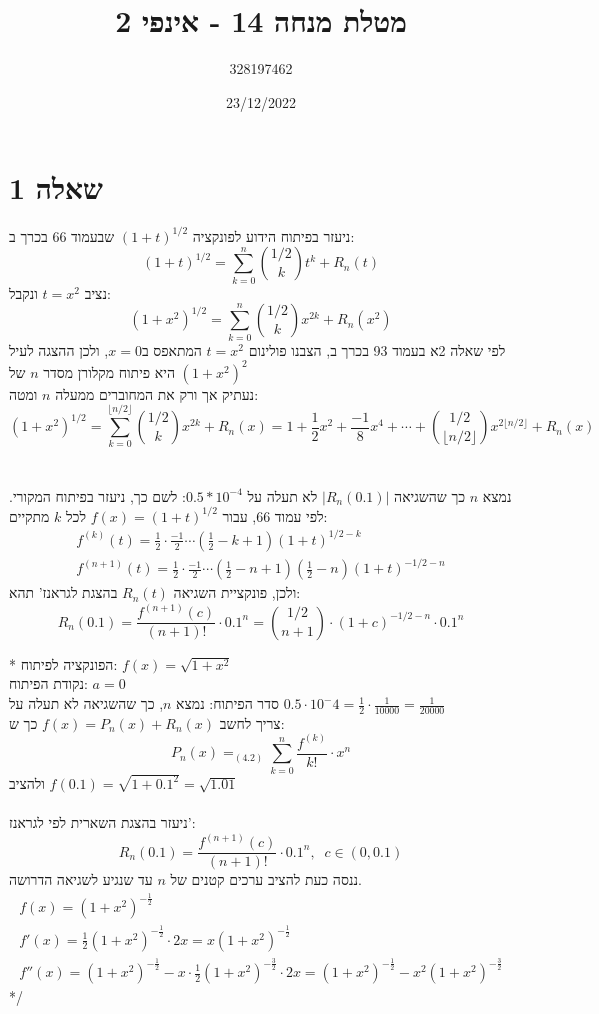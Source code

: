 \documentclass{article}
\title{מטלת מנחה 14 - אינפי 2}
\author{328197462}
\date{23/12/2022}
\DeclareMathOperator*{\equals}{=}
\begin{document}
\long{}
\maketitle

\section*{שאלה 1}

ניעזר בפיתוח הידוע לפונקציה $(1+t)^{1/2}$
שבעמוד 66 בכרך ב:
\[
    (1+t)^{1/2} = \sum_{k=0}^n \binom{1/2}{k}t^k+R_n(t)
\]
נציב $t=x^2$ ונקבל:
\[
    (1+x^2)^{1/2} = \sum_{k=0}^n \binom{1/2}{k}x^{2k}+R_n(x^2)
\]
לפי שאלה 2א בעמוד 93 בכרך ב, הצבנו פולינום $t=x^2$ המתאפס ב$x=0$,
ולכן ההצגה לעיל היא פיתוח מקלורן מסדר $n$ של $(1+x^2)^2$\\
נעתיק אך ורק את המחוברים ממעלה $n$ ומטה:
\[
    (1+x^2)^{1/2} =
    \sum_{k=0}^{\lfloor n/2 \rfloor} \binom{1/2}{k}x^{2k} + R_n(x) = 1 + \frac{1}{2}x^2+\frac{-1}{8}x^4+\cdots + \binom{1/2}{\lfloor n/2 \rfloor}x^{2\lfloor n/2 \rfloor} + R_n(x)
\]
\\\\
נמצא $n$ כך שהשגיאה $|R_n(0.1)|$ לא תעלה על $0.5*10^{-4}$:
לשם כך, ניעזר בפיתוח המקורי. לפי עמוד 66, עבור $f(x)=(1+t)^{1/2}$ לכל $k$ מתקיים:
\[
    \begin{matrix}
        f^{(k)}(t)=\frac{1}{2}\cdot \frac{-1}{2} \cdots (\frac{1}{2}-k+1)(1+t)^{1/2-k} \\
        f^{(n+1)}(t)=\frac{1}{2}\cdot \frac{-1}{2} \cdots (\frac{1}{2}-n+1)(\frac{1}{2}-n)(1+t)^{-1/2-n}
    \end{matrix}
\]
ולכן, פונקציית השגיאה $R_n(t)$ בהצגת לגראנז' תהא:
\[
    R_n(0.1) = \frac{f^{(n+1)}(c)}{(n+1)!} \cdot 0.1^n=
    \binom{1/2}{n+1}\cdot (1+c)^{-1/2-n} \cdot 0.1^n
\]

\/*
הפונקציה לפיתוח: $f(x)=\sqrt{1+x^2}$ \\
נקודת הפיתוח: $a=0$ \\
סדר הפיתוח: נמצא $n$,
כך שהשגיאה לא תעלה על $0.5\cdot 10^-4=\frac{1}{2}\cdot \frac{1}{10000}=\frac{1}{20000}$ \\
צריך לחשב $f(x)=P_n(x)+R_n(x)$ כך ש:
\[
    P_n(x) \equals_{(4.2)}\sum_{k=0}^n \frac{f^{(k)}}{k!}\cdot x^n
\]
ולהציב $f(0.1)=\sqrt{1+0.1^2}=\sqrt{1.01}$
\\\\
ניעזר בהצגת השארית לפי לגראנז': \\
\[
    R_n(0.1)=\frac{f^{(n+1)}(c)}{(n+1)!}\cdot {0.1}^n, \;\; c\in (0,0.1)
\]
ננסה כעת להציב ערכים קטנים של $n$ עד שנגיע לשגיאה הדרושה.
\[
    \begin{matrix}
        f(x) = (1+x^2)^{-\frac{1}{2}}                                                \\
        f'(x) = \frac{1}{2}(1+x^2)^{-\frac{1}{2}} \cdot 2x = x(1+x^2)^{-\frac{1}{2}} \\
        f''(x) = (1+x^2)^{-\frac{1}{2}} - x \cdot \frac{1}{2}(1+x^2)^{-\frac{3}{2}} \cdot 2x = (1+x^2)^{-\frac{1}{2}} - x^2(1+x^2)^{-\frac{3}{2}}
    \end{matrix}
\]
*/
\end{document}

